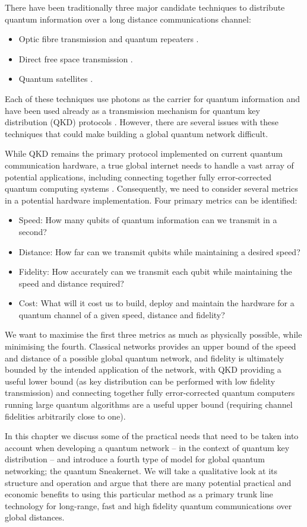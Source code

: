 \documentclass[twocolumn, aps, rmp, amsmath, amssymb, nofootinbib, superscriptaddress, longbibliography, floatfix, table-of-contents, eqsecnum]{revtex4-2}
\begin{document}
There have been traditionally three major candidate techniques to distribute quantum information over a long distance communications channel:
\begin{itemize}
\item Optic fibre transmission and quantum repeaters \cite{?}.
\item Direct free space transmission \cite{?}.
\item Quantum satellites \cite{?}. 
\end{itemize}
Each of these techniques use photons as the carrier for quantum information and have been used already as a transmission mechanism for quantum key distribution (QKD) protocols \cite{?}.  However, there are several issues with these techniques that could make building a global quantum network difficult. 

While QKD remains the primary protocol implemented on current quantum communication hardware, a true global internet needs to handle a vast array of potential applications, including connecting together fully error-corrected quantum computing systems \cite{?}. Consequently, we need to consider several metrics in a potential hardware implementation. Four primary metrics can be identified:
\begin{itemize}
\item Speed: How many qubits of quantum information can we transmit in a second?
\item Distance: How far can we transmit qubits while maintaining a desired speed?
\item Fidelity: How accurately can we transmit each qubit while maintaining the speed and distance required?
\item Cost: What will it cost us to build, deploy and maintain the hardware for a quantum channel of a given speed, distance and fidelity?
\end{itemize}
We want to maximise the first three metrics as much as physically possible, while minimising the fourth. Classical networks provides an upper bound of the speed and distance of a possible global quantum network, and fidelity is ultimately bounded by the intended application of the network, with QKD providing a useful lower bound (as key distribution can be performed with low fidelity transmission) and connecting together fully error-corrected quantum computers running large quantum algorithms are a useful upper bound (requiring channel fidelities arbitrarily close to one). 

In this chapter we discuss some of the practical needs that need to be taken into account when developing a quantum network -- in the context of quantum key distribution -- and introduce a fourth type of model for global quantum networking; the quantum Sneakernet. We will take a qualitative look at its structure and operation and argue that there are many potential practical and economic benefits to using this particular method as a primary trunk line technology for long-range, fast and high fidelity quantum communications over global distances.
\end{document}

